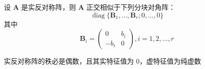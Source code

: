 \begin{theorem}
    设 $\bm{A}$ 是实反对称阵，则 $\bm{A}$ 正交相似于下列分块对角阵：
    \[
        \operatorname{diag}\{\bm{B}_1, \ldots, \bm{B}_r; 0, \ldots, 0\}
    \]
    其中
    \[
        \bm{B}_i = \begin{pmatrix}
            0    & b_i \\
            -b_i & 0
        \end{pmatrix}, i = 1, 2, \ldots, r
    \]
\end{theorem}

\begin{corollary}
    实反对称阵的秩必是偶数，且其实特征值为 $0$，虚特征值为纯虚数
\end{corollary}

